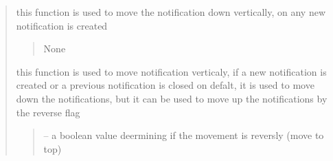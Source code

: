 \documentclass[letterpaper,10pt,english]{sphinxmanual}
\begin{document}
\begin{quote}
\begin{savenotes}
\begin{fulllineitems}
\begin{savenotes}
\begin{fulllineitems}
\begin{quote}
\begin{description}
\end{description}\end{quote}

\end{fulllineitems}\end{savenotes}


\begin{savenotes}\begin{fulllineitems}
\label{\detokenize{setting/notif_UI:oxin.notif_UI.UI_main_window.win_move_down}}
\pysigstartsignatures
{}
\pysigstopsignatures
\sphinxAtStartPar
this function is used to move the notification down vertically, on any new notification is created
\begin{quote}\begin{description}
\sphinxAtStartPar
None

\end{description}\end{quote}

\end{fulllineitems}\end{savenotes}


\begin{savenotes}\begin{fulllineitems}
\label{\detokenize{setting/notif_UI:oxin.notif_UI.UI_main_window.win_move_down_run_timer}}
\pysigstartsignatures
{}
\pysigstopsignatures
\sphinxAtStartPar
this function is used to move notification verticaly, if a new notification is created or a previous notification is closed
on defalt, it is used to move down the notifications, but it can be used to move up the notifications by the reverse flag
\begin{quote}\begin{description}
\sphinxAtStartPar
{} – a boolean value deermining if the movement is reversly (move to top)


\end{description}
\end{quote}
\end{fulllineitems}
\end{savenotes}
\end{fulllineitems}
\end{savenotes}
\end{quote}
\end{document}
